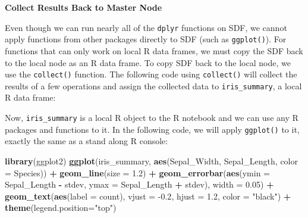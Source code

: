\documentclass[12pt,]{krantz}
\makeatletter
\newenvironment{Shaded}{\begin{snugshade}}{\end{snugshade}}
\newcommand{\DataTypeTok}[1]{\textcolor[rgb]{0.27,0.27,0.27}{#1}}
\newcommand{\DecValTok}[1]{\textcolor[rgb]{0.06,0.06,0.06}{#1}}
\newcommand{\FloatTok}[1]{\textcolor[rgb]{0.06,0.06,0.06}{#1}}
\newcommand{\KeywordTok}[1]{\textcolor[rgb]{0.27,0.27,0.27}{\textbf{#1}}}
\newcommand{\NormalTok}[1]{#1}
\newcommand{\OperatorTok}[1]{\textcolor[rgb]{0.43,0.43,0.43}{\textbf{#1}}}
\newcommand{\StringTok}[1]{\textcolor[rgb]{0.5,0.5,0.5}{#1}}
\newenvironment{kframe}{%
\medskip{}
\setlength{\fboxsep}{.8em}
 \def\at@end@of@kframe{}%
 \ifinner\ifhmode%
  \def\at@end@of@kframe{\end{minipage}}%
  \begin{minipage}{\columnwidth}%
 \fi\fi%
 \def\FrameCommand##1{\hskip\@totalleftmargin \hskip-\fboxsep
 \colorbox{shadecolor}{##1}\hskip-\fboxsep
     \hskip-\linewidth \hskip-\@totalleftmargin \hskip\columnwidth}%
 \MakeFramed {\advance\hsize-\width
   \@totalleftmargin\z@ \linewidth\hsize
   \@setminipage}}%
 {\par\unskip\endMakeFramed%
 \at@end@of@kframe}
\renewenvironment{Shaded}{\begin{kframe}}{\end{kframe}}
\makeatother
\begin{document}
\textbf{Collect Results Back to Master Node}

Even though we can run nearly all of the \texttt{dplyr} functions on SDF, we cannot apply functions from other packages directly to SDF (such as \texttt{ggplot()}). For functions that can only work on local R data frames, we must copy the SDF back to the local node as an R data frame. To copy SDF back to the local node, we use the \texttt{collect()} function. The following code using \texttt{collect()} will collect the results of a few operations and assign the collected data to \texttt{iris\_summary}, a local R data frame:

\begin{Shaded}
\end{Shaded}

Now, \texttt{iris\_summary} is a local R object to the R notebook and we can use any R packages and functions to it. In the following code, we will apply \texttt{ggplot()} to it, exactly the same as a stand along R console:

\begin{Shaded}
\begin{Highlighting}[]
\KeywordTok{library}\NormalTok{(ggplot2)}
\KeywordTok{ggplot}\NormalTok{(iris_summary, }\KeywordTok{aes}\NormalTok{(Sepal_Width, Sepal_Length, }
                         \DataTypeTok{color =}\NormalTok{ Species)) }\OperatorTok{+}
\StringTok{  }\KeywordTok{geom_line}\NormalTok{(}\DataTypeTok{size =} \FloatTok{1.2}\NormalTok{) }\OperatorTok{+}
\StringTok{  }\KeywordTok{geom_errorbar}\NormalTok{(}\KeywordTok{aes}\NormalTok{(}\DataTypeTok{ymin =}\NormalTok{ Sepal_Length }\OperatorTok{-}\StringTok{ }\NormalTok{stdev, }
                    \DataTypeTok{ymax =}\NormalTok{ Sepal_Length }\OperatorTok{+}\StringTok{ }\NormalTok{stdev), }
                    \DataTypeTok{width =} \FloatTok{0.05}\NormalTok{) }\OperatorTok{+}
\StringTok{  }\KeywordTok{geom_text}\NormalTok{(}\KeywordTok{aes}\NormalTok{(}\DataTypeTok{label =}\NormalTok{ count), }\DataTypeTok{vjust =} \FloatTok{-0.2}\NormalTok{, }\DataTypeTok{hjust =} \FloatTok{1.2}\NormalTok{, }
            \DataTypeTok{color =} \StringTok{"black"}\NormalTok{) }\OperatorTok{+}
\StringTok{  }\KeywordTok{theme}\NormalTok{(}\DataTypeTok{legend.position=}\StringTok{"top"}\NormalTok{)}
\end{Highlighting}
\end{Shaded}
\end{document}
